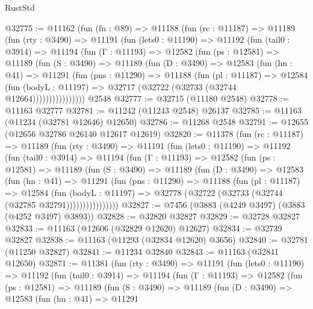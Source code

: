 \begin{lexlean}{RustStd}
\begin{coremodule}
@32775 := @11162
    (fun (fn : @89) =>
    @11188
      (fun (rc : @11187) =>
      @11189
        (fun (rty : @3490) =>
        @11191
          (fun (lets0 : @11190) =>
          @11192
            (fun (tail0 : @3914) =>
            @11194
              (fun (Γ : @11193) =>
              @12582
                (fun (ps : @12581) =>
                @11189
                  (fun (S : @3490) =>
                  @11189
                    (fun (D : @3490) =>
                    @12583
                      (fun (hn : @41) =>
                      @11291
                        (fun (pns : @11290) =>
                        @11188
                          (fun (pl : @11187) =>
                          @12584
                            (fun (bodyL : @11197) =>
                            @32717 (@32722 (@32733 (@32744 @12664))))))))))))))))
    @2548
@32777 := @32715 (@11180 @2548)
@32778 := @11163 @32777
@32781 := @11242 (@11243 @2548) @26137
@32785 := @11163 (@11234 (@32781 @12646) @12650)
@32786 := @11268 @2548
@32791 := @12655 (@12656 @32786 @26140 @12617 @12619)
@32820 := @11378
    (fun (rc : @11187) =>
    @11189
      (fun (rty : @3490) =>
      @11191
        (fun (lets0 : @11190) =>
        @11192
          (fun (tail0 : @3914) =>
          @11194
            (fun (Γ : @11193) =>
            @12582
              (fun (ps : @12581) =>
              @11189
                (fun (S : @3490) =>
                @11189
                  (fun (D : @3490) =>
                  @12583
                    (fun (hn : @41) =>
                    @11291
                      (fun (pns : @11290) =>
                      @11188
                        (fun (pl : @11187) =>
                        @12584
                          (fun (bodyL : @11197) =>
                          @32778 (@32722 (@32733 (@32744 (@32785 @32791))))))))))))))))
@32827 := @7456 (@3883 (@4249 @3497) (@3883 (@4252 @3497) @3893))
@32828 := @32820 @32827
@32829 := @32728 @32827
@32833 := @11163 (@12606 (@32829 @12620) @12627)
@32834 := @32739 @32827
@32838 := @11163 (@11293 (@32834 @12620) @3656)
@32840 := @32781 (@11250 @32827)
@32841 := @11234 @32840
@32843 := @11163 (@32841 @12650)
@32871 := @11381
    (fun (rty : @3490) =>
    @11191
      (fun (lets0 : @11190) =>
      @11192
        (fun (tail0 : @3914) =>
        @11194
          (fun (Γ : @11193) =>
          @12582
            (fun (ps : @12581) =>
            @11189
              (fun (S : @3490) =>
              @11189
                (fun (D : @3490) =>
                @12583
                  (fun (hn : @41) =>
                  @11291

\end{coremodule}
\end{lexlean}
